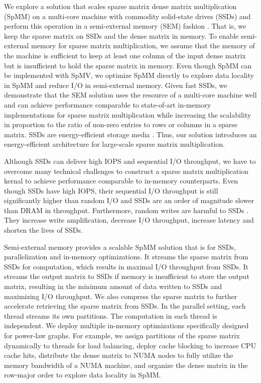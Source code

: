 We explore a solution that scales sparse matrix dense matrix multiplication
(SpMM) on a multi-core machine with commodity solid-state drives (SSDs) and
perform this operation in a semi-external memory (SEM) fashion
\cite{flashgraph, Abello98}. That is, we keep the sparse matrix on SSDs and
the dense matrix in memory. 
To enable semi-external memory for sparse matrix multiplication, we assume
that the memory of the machine is sufficient to keep at least one column
of the input dense matrix but is insufficient to hold the sparse matrix
in memory. Even though SpMM can be implemented with SpMV,
we optimize SpMM directly to explore data locality in SpMM and reduce I/O
in semi-external memory. Given fast SSDs, we demonstrate that the SEM solution
uses the resource of a multi-core machine well and
can achieve performance comparable to state-of-art in-memory implementations
for sparse matrix multiplication while increasing the scalability in proportion
to the ratio of non-zero entries to rows or columns in a sparse matrix.
SSDs are energy-efficient storage media \cite{}. Thus, our solution introduces
an energy-efficient architecture for large-scale sparse matrix multiplication.


Although SSDs can deliver high IOPS and sequential I/O throughput, we have
to overcome many technical challenges to construct a sparse matrix
multiplication kernal to achieve performance comparable to in-memory
counterparts. Even though SSDs have high IOPS, their sequential I/O throughput
is still significantly higher than random I/O and SSDs are an order of
magnitude slower than DRAM in throughput. Furthermore, random writes are harmful
to SSDs \cite{sfs}. They increase write amplification, decrease I/O throughput,
increase latency and shorten the lives of SSDs.

Semi-external memory provides a scalable SpMM
solution that is  for SSDs, parallelization and in-memory optimizations.
It streams the sparse matrix from SSDs for computation, which results in maximal
I/O throughput from SSDs. It streams the output matrix to SSDs if
memory is insufficient to store the output matrix, resulting in
the minimum amount of data written to SSDs and maximizing I/O throughput.
We also compress
the sparse matrix to further accelerate retrieving the sparse matrix from SSDs.
In the parallel setting, each thread streams its own partitions.
The computation in each thread is independent.
We deploy multiple in-memory optimizations specifically designed for power-law
graphs. For example, we assign partitions of the sparse matrix dynamically to
threads for load balancing, deploy cache blocking to increase CPU cache hits,
distribute the dense matrix to NUMA nodes to fully utilize the memory
bandwidth of a NUMA machine, and organize the dense matrix in the row-major order
to explore data locality in SpMM.

